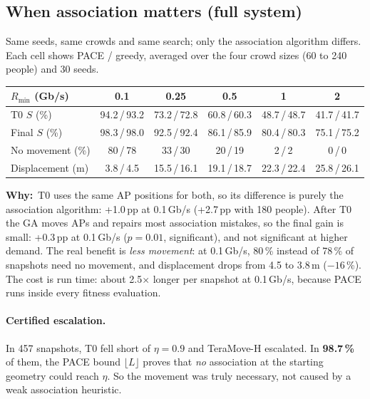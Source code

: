 \documentclass[11pt,a4paper]{article}
\newcommand{\Rmin}{R_{\min}}
\newcommand{\why}[1]{\par\smallskip\noindent\begin{minipage}{\linewidth}\small
  \textcolor{whyc}{\textbf{Why:}}~#1\end{minipage}\par\medskip}
\begin{document}
\subsection{When association matters (full system)}
Same seeds, same crowds and same search; only the association algorithm differs. Each cell
shows PACE / greedy, averaged over the four crowd sizes (60 to 240 people) and 30 seeds.
\begin{center}
\small\setlength{\tabcolsep}{4pt}
\begin{tabular}{@{}lccccc@{}}
\toprule
$\Rmin$ (Gb/s) & 0.1 & 0.25 & 0.5 & 1 & 2\\
\midrule
T0 $S$ (\%) & 94.2\,/\,93.2 & 73.2\,/\,72.8 & 60.8\,/\,60.3 & 48.7\,/\,48.7 & 41.7\,/\,41.7\\
Final $S$ (\%) & 98.3\,/\,98.0 & 92.5\,/\,92.4 & 86.1\,/\,85.9 & 80.4\,/\,80.3 & 75.1\,/\,75.2\\
No movement (\%) & 80\,/\,78 & 33\,/\,30 & 20\,/\,19 & 2\,/\,2 & 0\,/\,0\\
Displacement (m) & 3.8\,/\,4.5 & 15.5\,/\,16.1 & 19.1\,/\,18.7 & 22.3\,/\,22.4 & 25.8\,/\,26.1\\
\bottomrule
\end{tabular}
\end{center}
\why{T0 uses the same AP positions for both, so its difference is purely the association algorithm: +1.0\,pp at 0.1\,Gb/s (+2.7\,pp with 180 people). After T0 the GA moves APs and repairs most association mistakes, so the final gain is small: +0.3\,pp at 0.1\,Gb/s ($p=0.01$, significant), and not significant at higher demand. The real benefit is \emph{less movement}: at 0.1\,Gb/s, 80\,\% instead of 78\,\% of snapshots need no movement, and displacement drops from 4.5 to 3.8\,m ($-16$\,\%). The cost is run time: about 2.5$\times$ longer per snapshot at 0.1\,Gb/s, because PACE runs inside every fitness evaluation.}

\paragraph{Certified escalation.} In 457 snapshots, T0 fell short of $\eta=0.9$ and TeraMove-H
escalated. In \textbf{98.7\,\%} of them, the PACE bound $\lfloor L\rfloor$ proves that \emph{no}
association at the starting geometry could reach $\eta$. So the movement was truly necessary,
not caused by a weak association heuristic.
\end{document}

